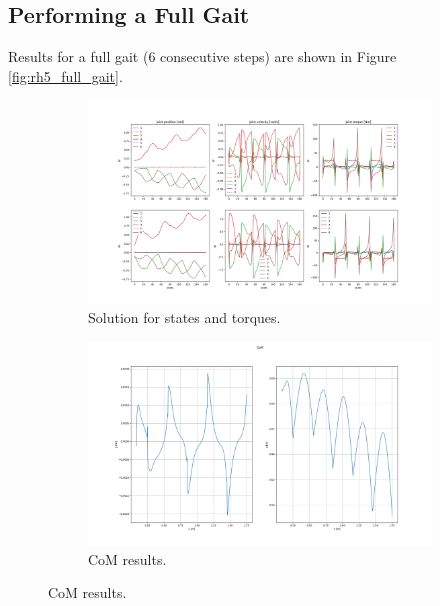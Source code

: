\subsection{Performing a Full Gait}
Results for a full gait (6 consecutive steps) are shown in Figure \ref{fig:rh5_full_gait}.
\begin{figure}[h!]
\centering
\begin{subfigure}{1\textwidth}
  \centering
  \includegraphics[width=1\linewidth]{Media/Crocoddyl/RH5Legs/RH5Gait_Solution.png}
  \caption{Solution for states and torques.}
\end{subfigure}
\begin{subfigure}{1\textwidth}
  \centering
\includegraphics[width=1\linewidth]{Media/Crocoddyl/RH5Legs/RH5Gait_CoM2.png}
\caption{CoM results.}
\end{subfigure}
\end{figure}
